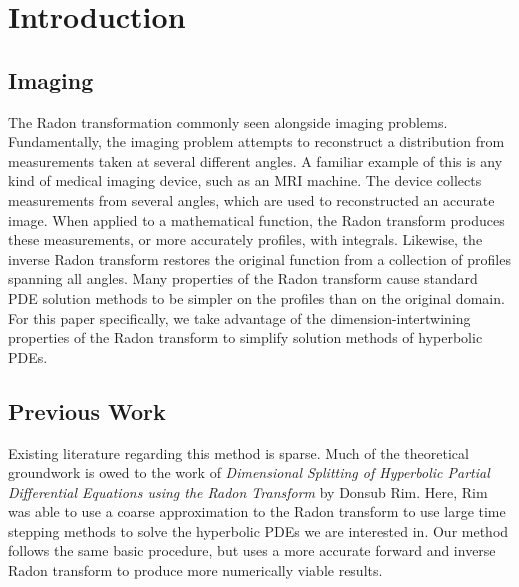
\section{Introduction}

\subsection{Imaging}

The Radon transformation commonly seen alongside imaging problems.
Fundamentally, the imaging problem attempts to reconstruct a distribution from measurements taken at several different angles.
A familiar example of this is any kind of medical imaging device, such as an MRI machine.
The device collects measurements from several angles, which are used to reconstructed an accurate image.
When applied to a mathematical function, the Radon transform produces these measurements, or more accurately profiles, with integrals.
Likewise, the inverse Radon transform restores the original function from a collection of profiles spanning all angles.
Many properties of the Radon transform cause standard PDE solution methods to be simpler on the profiles than on the original domain.
For this paper specifically, we take advantage of the dimension-intertwining properties of the Radon transform to simplify solution methods of hyperbolic PDEs.

\subsection{Previous Work}

Existing literature regarding this method is sparse.
Much of the theoretical groundwork is owed to the work of \textit{Dimensional Splitting of Hyperbolic Partial Differential Equations using the Radon Transform} by Donsub Rim.\cite{Rim:5}
Here, Rim was able to use a coarse approximation to the Radon transform to use large time stepping methods to solve the hyperbolic PDEs we are interested in.
Our method follows the same basic procedure, but uses a more accurate forward and inverse Radon transform to produce more numerically viable results.
